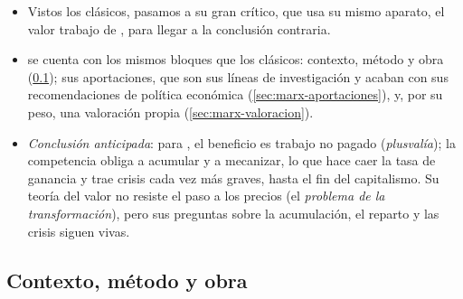 \documentclass[11pt]{article}
\begin{document}
\begin{itemize}
\item Vistos los clásicos, pasamos a su gran crítico, que usa su mismo aparato, el valor trabajo de , para llegar a la conclusión contraria.
\item {} se cuenta con los mismos bloques que los clásicos: contexto, método y obra (\ref{sec:marx-contexto}); sus aportaciones, que son sus líneas de investigación y acaban con sus recomendaciones de política económica (\ref{sec:marx-aportaciones}), y, por su peso, una valoración propia (\ref{sec:marx-valoracion}).
\item \emph{Conclusión anticipada}: para , el beneficio es trabajo no pagado (\emph{plusvalía}); la competencia obliga a acumular y a mecanizar, lo que hace caer la tasa de ganancia y trae crisis cada vez más graves, hasta el fin del capitalismo. Su teoría del valor no resiste el paso a los precios (el \emph{problema de la transformación}), pero sus preguntas sobre la acumulación, el reparto y las crisis siguen vivas.
\end{itemize}

\subsection{Contexto, método y obra}\label{sec:marx-contexto}
\end{document}
